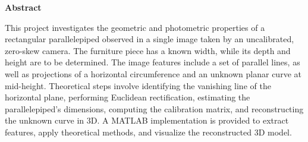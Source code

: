 \small
\noindent\textbf{Abstract}

This project investigates the geometric and photometric properties of a rectangular parallelepiped observed in a single image taken by an uncalibrated, zero-skew camera. 
The furniture piece has a known width, while its depth and height are to be determined. 
The image features include a set of parallel lines, as well as projections of a horizontal circumference and an unknown planar curve at mid-height.
Theoretical steps involve identifying the vanishing line of the horizontal plane, performing Euclidean rectification, estimating the parallelepiped’s dimensions, computing the calibration matrix, and reconstructing the unknown curve in 3D. 
A MATLAB implementation is provided to extract features, apply theoretical methods, and visualize the reconstructed 3D model.